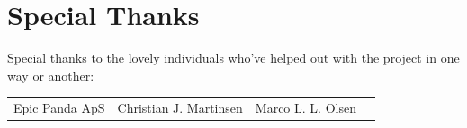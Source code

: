 \documentclass[a4paper]{book}
\begin{document}
\section*{Special Thanks}
Special thanks to the lovely individuals who've helped out with the project in one way or another:
\begin{center}
    \begin{tabular}{cccc}
        Epic Panda ApS & Christian J. Martinsen & Marco L. L. Olsen\\
    \end{tabular}
\end{center}

\tableofcontents
\mainmatter




\end{document}
